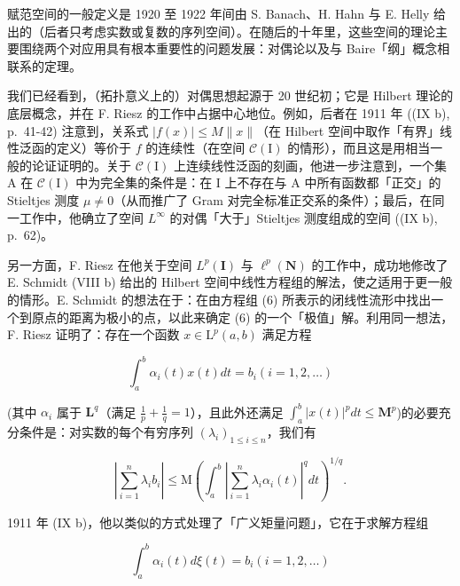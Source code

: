 赋范空间的一般定义是 1920 至 1922 年间由 S. Banach、H. Hahn 与 E. Helly 给出的（后者只考虑实数或复数的序列空间）。在随后的十年里，这些空间的理论主要围绕两个对应用具有根本重要性的问题发展：对偶论以及与 Baire「纲」概念相联系的定理。

我们已经看到，（拓扑意义上的）对偶思想起源于 20 世纪初；它是 Hilbert 理论的底层概念，并在 F. Riesz 的工作中占据中心地位。例如，后者在 1911 年 ((IX b), p.~41-42) 注意到，关系式 \(|f(x)| \leqslant M \| x\|\)（在 Hilbert 空间中取作「有界」线性泛函的定义）等价于 \(f\) 的连续性（在空间 \(\mathcal{C}(\mathrm{I})\) 的情形），而且这是用相当一般的论证证明的。关于 \(\mathcal{C}(\mathrm{I})\) 上连续线性泛函的刻画，他进一步注意到，一个集 A 在 \(\mathcal{C}(\mathrm{I})\) 中为完全集的条件是：在 I 上不存在与 A 中所有函数都「正交」的 Stieltjes 测度 \(\mu \neq 0\)（从而推广了 Gram 对完全标准正交系的条件）；最后，在同一工作中，他确立了空间 \(L^{\infty}\) 的对偶「大于」Stieltjes 测度组成的空间 ((IX b), p.~62)。

另一方面，F. Riesz 在他关于空间 \(L^{p}(\mathbf{I})\) 与 \(\ell^{p}(\mathbf{N})\) 的工作中，成功地修改了 E. Schmidt (VIII b) 给出的 Hilbert 空间中线性方程组的解法，使之适用于更一般的情形。E. Schmidt 的想法在于：在由方程组 (6) 所表示的闭线性流形中找出一个到原点的距离为极小的点，以此来确定 (6) 的一个「极值」解。利用同一想法，F. Riesz 证明了：存在一个函数 \(x \in \mathrm{L}^{p}(a, b)\) 满足方程

\[
\int_ {a} ^ {b} \alpha_ {i} (t) x (t) d t = b _ {i} (i = 1, 2, \dots)\tag{9}
\]

(其中 \(\alpha_{i}\) 属于 \(\mathbf{L}^q\)（满足 \(\frac{1}{p} +\frac{1}{q} = 1\)），且此外还满足 \(\int_{a}^{b}|x(t)|^{p}dt\leqslant \mathbf{M}^{p}\))的必要充分条件是：对实数的每个有穷序列 \((\lambda_i)_{1\leqslant i\leqslant n}\)，我们有

\[
\left| \sum_ {i = 1} ^ {n} \lambda_ {i} b _ {i} \right| \leqslant \mathrm{M} \left(\int_ {a} ^ {b} \left| \sum_ {i = 1} ^ {n} \lambda_ {i} \alpha_ {i} (t) \right| ^ {q} d t\right) ^ {1 / q}.\tag{10}
\]

1911 年 (IX b)，他以类似的方式处理了「广义矩量问题」，它在于求解方程组

\[
\int_ {a} ^ {b} \alpha_ {i} (t) d \xi (t) = b _ {i} (i = 1, 2, \dots)\tag{11}
\]

